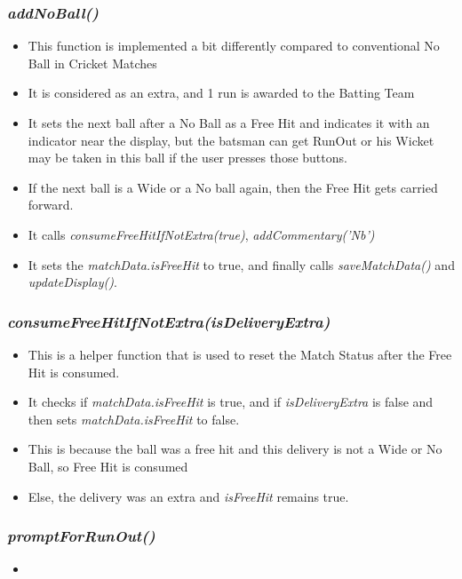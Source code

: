 \documentclass[a4paper,12pt]{article}
\begin{document}
\subsubsection{\textit{addNoBall()}}
\begin{itemize}
\item This function is implemented a bit differently compared to conventional No Ball in Cricket Matches
\item It is considered as an extra, and 1 run is awarded to the Batting Team
\item It sets the next ball after a No Ball as a Free Hit and indicates it with an indicator near the display, but the batsman can get RunOut or his Wicket may be taken in this ball if the user presses those buttons.
\item If the next ball is a Wide or a No ball again, then the Free Hit gets carried forward.
\item It calls \textit{consumeFreeHitIfNotExtra(true)}, \textit{addCommentary('Nb')}
\item It sets the \textit{matchData.isFreeHit} to true, and finally calls \textit{saveMatchData()} and \textit{updateDisplay()}.
\end{itemize}

\subsubsection{\textit{consumeFreeHitIfNotExtra(isDeliveryExtra)}}
\begin{itemize}
\item This is a helper function that is used to reset the Match Status after the Free Hit is consumed.
\item It checks if \textit{matchData.isFreeHit} is true, and if \textit{isDeliveryExtra} is false and then sets \textit{matchData.isFreeHit} to false.
\item This is because the ball was a free hit and this delivery is not a Wide or No Ball, so Free Hit is consumed
\item Else, the delivery was an extra and \textit{isFreeHit} remains true.
\end{itemize}

\subsubsection{\textit{promptForRunOut()}}
\begin{itemize}
\item 
\end{itemize}
\end{document}
